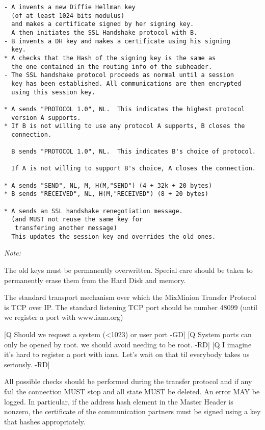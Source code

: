\begin{verbatim}
- A invents a new Diffie Hellman key 
  (of at least 1024 bits modulus)
  and makes a certificate signed by her signing key.
  A then initiates the SSL Handshake protocol with B.
- B invents a DH key and makes a certificate using his signing
  key.
* A checks that the Hash of the signing key is the same as
  the one contained in the routing info of the subheader.
- The SSL handshake protocol proceeds as normal until a session
  key has been established. All communications are then encrypted
  using this session key.

* A sends "PROTOCOL 1.0", NL.  This indicates the highest protocol
  version A supports.
* If B is not willing to use any protocol A supports, B closes the 
  connection.

  B sends "PROTOCOL 1.0", NL.  This indicates B's choice of protocol.

  If A is not willing to support B's choice, A closes the connection.
  
* A sends "SEND", NL, M, H(M,"SEND") (4 + 32k + 20 bytes)
* B sends "RECEIVED", NL, H(M,"RECEIVED") (8 + 20 bytes)

* A sends an SSL handshake renegotiation message.
  (and MUST not reuse the same key for 
   transfering another message)
  This updates the session key and overrides the old ones.
\end{verbatim}

\emph{Note:}

The old keys must be permanently overwritten. Special care should be
taken to permanently erase them from the Hard Disk and memory. 

The standard transport mechanism over which the MixMinion Transfer
Protocol is TCP over IP. The standard listening TCP port should be 
number 48099 (until we register a port with www.iana.org)

[Q Should we request a system (<1023) or user port -GD]
[Q System ports can only be opened by root. we should avoid needing
to be root. -RD]
[Q I imagine it's hard to register a port with iana. Let's wait on
that til everybody takes us seriously. -RD]

All possible checks should be performed during the transfer protocol
and if any fail the connection MUST stop and all state MUST
be deleted. An error MAY be logged. In particular, if the address
hash element in the Master Header is nonzero, the certificate of
the communication partners must be signed using a key that hashes
appropriately.

